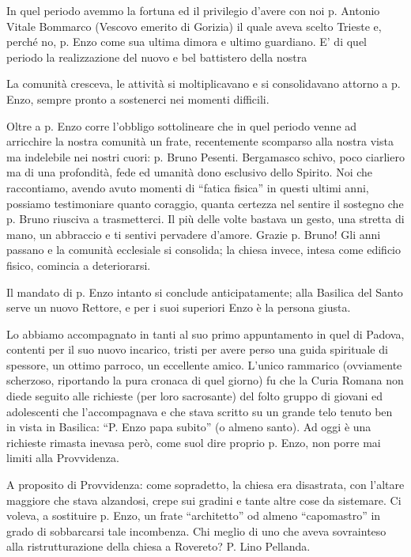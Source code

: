 In quel periodo avemmo la fortuna ed il privilegio d’avere con noi p. Antonio Vitale Bommarco 
(Vescovo emerito di Gorizia) il quale aveva scelto Trieste e, perché no, p. Enzo come sua ultima 
dimora e ultimo guardiano. E’ di quel periodo la realizzazione del nuovo e bel battistero della nostra 

La comunità cresceva, le attività si moltiplicavano e si consolidavano attorno a p. Enzo, sempre 
pronto a sostenerci nei momenti difficili.

Oltre a p. Enzo corre l’obbligo sottolineare che in quel periodo venne ad arricchire la nostra 
comunità un frate, recentemente scomparso alla nostra vista ma indelebile nei nostri cuori: p. Bruno 
Pesenti. Bergamasco schivo, poco ciarliero ma di una profondità, fede ed umanità dono esclusivo 
dello Spirito. Noi che raccontiamo, avendo avuto momenti di “fatica fisica” in questi ultimi anni, 
possiamo testimoniare quanto coraggio, quanta certezza nel sentire il sostegno che p. Bruno riusciva 
a trasmetterci. Il più delle volte bastava un gesto, una stretta di mano, un abbraccio e ti sentivi 
pervadere d’amore. Grazie p. Bruno! 
Gli anni passano e la comunità ecclesiale si consolida; la chiesa invece, intesa come edificio fisico, 
comincia a deteriorarsi.

Il mandato di p. Enzo intanto si conclude anticipatamente; alla Basilica del Santo serve un nuovo 
Rettore, e per i suoi superiori Enzo è la persona giusta.

Lo abbiamo accompagnato in tanti al suo primo appuntamento in quel di Padova, contenti per il suo 
nuovo incarico, tristi per avere perso una guida spirituale di spessore, un ottimo parroco, un 
eccellente amico. L’unico rammarico (ovviamente scherzoso, riportando la pura cronaca di quel 
giorno) fu che la Curia Romana non diede seguito alle richieste  (per loro sacrosante) del folto 
gruppo di giovani ed adolescenti che l’accompagnava e che stava scritto su un grande telo tenuto 
ben in vista in Basilica: “P. Enzo papa subito” (o almeno santo). Ad oggi è una richieste rimasta 
inevasa però, come suol dire proprio p. Enzo, non porre mai limiti alla Provvidenza. 

A proposito di Provvidenza: come sopradetto, la chiesa era disastrata, con l’altare maggiore 
che stava alzandosi, crepe sui gradini e tante altre cose da sistemare. Ci voleva, a sostituire p. Enzo, 
un frate “architetto” od almeno “capomastro” in grado di sobbarcarsi tale incombenza.
Chi meglio di uno che aveva sovrainteso alla ristrutturazione della chiesa a Rovereto? P. Lino 
Pellanda.

